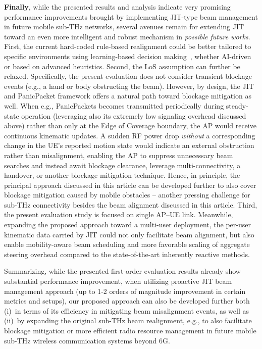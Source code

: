 \documentclass[fleqn,10pt]{wlscirep}
\begin{document}
\textbf{Finally}, while the presented results and analysis indicate very promising performance improvements brought by implementing JIT-type beam management in future mobile sub-THz networks, several avenues remain for extending JIT toward an even more intelligent and robust mechanism in \emph{possible future works}. First, the current hard-coded rule-based realignment could be better tailored to specific environments using learning-based decision making~\cite{10036372}, whether AI-driven or based on advanced heuristics. Second, the LoS assumption can further be relaxed. Specifically, the present evaluation does not consider transient blockage events (e.g., a hand or body obstructing the beam). However, by design, the JIT and PanicPacket framework offers a natural path toward blockage mitigation as well. When e.g., PanicPackets becomes transmitted periodically during steady-state operation (leveraging also its extremely low signaling overhead discussed above) rather than only at the Edge of Coverage boundary, the AP would receive continuous kinematic updates. A sudden RF power drop \emph{without} a corresponding change in the UE's reported motion state would indicate an external obstruction rather than misalignment, enabling the AP to suppress unnecessary beam searches and instead await blockage clearance, leverage multi-connectivity, a handover, or another blockage mitigation technique. Hence, in principle, the principal approach discussed in this article can be developed further to also cover blockage mitigation caused by mobile obstacles -- another pressing challenge for sub-THz connectivity besides the beam alignment discussed in this article. Third, the present evaluation study is focused on single AP--UE link. Meanwhile, expanding the proposed approach toward a multi-user deployment, the per-user kinematic data carried by JIT could not only facilitate beam alignment, but also enable mobility-aware beam scheduling and more favorable scaling of aggregate steering overhead compared to the state-of-the-art inherently reactive methods.

Summarizing, while the presented first-order evaluation results already show substantial performance improvement, when utilizing proactive JIT beam management approach (up to 1-2 orders of magnitude improvement in certain metrics and setups), our proposed approach can also be developed further both (i)~in terms of its efficiency in mitigating beam misalignment events, as well as (ii)~by expanding the original sub-THz beam realignment, e.g., to also facilitate blockage mitigation or more efficient radio resource management in future mobile sub-THz wireless communication systems beyond 6G.
\end{document}
